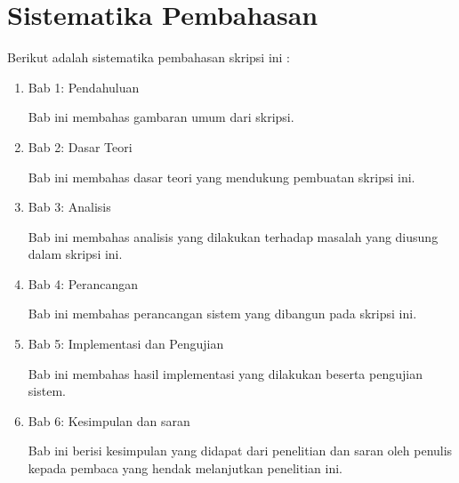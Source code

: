 \section{Sistematika Pembahasan}
\label{sec:sispem}
Berikut adalah sistematika pembahasan skripsi ini :
\begin{enumerate}
\item Bab 1: Pendahuluan

Bab ini membahas gambaran umum dari skripsi.

\item Bab 2: Dasar Teori

Bab ini membahas dasar teori yang mendukung pembuatan skripsi ini.

\item Bab 3: Analisis

Bab ini membahas analisis yang dilakukan terhadap masalah yang diusung dalam skripsi ini.

\item Bab 4: Perancangan

Bab ini membahas perancangan sistem yang dibangun pada skripsi ini.

\item Bab 5: Implementasi dan Pengujian

Bab ini membahas hasil implementasi yang dilakukan beserta pengujian sistem.

\item Bab 6: Kesimpulan dan saran

Bab ini berisi kesimpulan yang didapat dari penelitian dan saran oleh penulis kepada pembaca yang hendak melanjutkan penelitian ini. 

\end{enumerate}